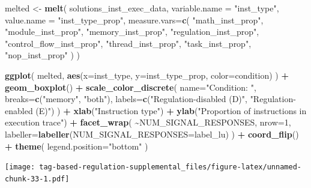 \documentclass[
]{book}
\newenvironment{Shaded}{\begin{snugshade}}{\end{snugshade}}
\newcommand{\DataTypeTok}[1]{\textcolor[rgb]{0.13,0.29,0.53}{#1}}
\newcommand{\DecValTok}[1]{\textcolor[rgb]{0.00,0.00,0.81}{#1}}
\newcommand{\KeywordTok}[1]{\textcolor[rgb]{0.13,0.29,0.53}{\textbf{#1}}}
\newcommand{\NormalTok}[1]{#1}
\newcommand{\OperatorTok}[1]{\textcolor[rgb]{0.81,0.36,0.00}{\textbf{#1}}}
\newcommand{\StringTok}[1]{\textcolor[rgb]{0.31,0.60,0.02}{#1}}
\begin{document}
\begin{Shaded}
\begin{Highlighting}[]
\NormalTok{melted \textless{}{-}}\StringTok{ }\KeywordTok{melt}\NormalTok{(}
\NormalTok{  solutions\_inst\_exec\_data,}
  \DataTypeTok{variable.name =} \StringTok{"inst\_type"}\NormalTok{,}
  \DataTypeTok{value.name =} \StringTok{"inst\_type\_prop"}\NormalTok{,}
  \DataTypeTok{measure.vars=}\KeywordTok{c}\NormalTok{(}
    \StringTok{"math\_inst\_prop"}\NormalTok{,}
    \StringTok{"module\_inst\_prop"}\NormalTok{,}
    \StringTok{"memory\_inst\_prop"}\NormalTok{,}
    \StringTok{"regulation\_inst\_prop"}\NormalTok{,}
    \StringTok{"control\_flow\_inst\_prop"}\NormalTok{,}
    \StringTok{"thread\_inst\_prop"}\NormalTok{,}
    \StringTok{"task\_inst\_prop"}\NormalTok{,}
    \StringTok{"nop\_inst\_prop"}
\NormalTok{  )}
\NormalTok{)}

\KeywordTok{ggplot}\NormalTok{( melted, }\KeywordTok{aes}\NormalTok{(}\DataTypeTok{x=}\NormalTok{inst\_type, }\DataTypeTok{y=}\NormalTok{inst\_type\_prop, }\DataTypeTok{color=}\NormalTok{condition) ) }\OperatorTok{+}
\StringTok{  }\KeywordTok{geom\_boxplot}\NormalTok{() }\OperatorTok{+}
\StringTok{  }\KeywordTok{scale\_color\_discrete}\NormalTok{(}
    \DataTypeTok{name=}\StringTok{"Condition: "}\NormalTok{,}
    \DataTypeTok{breaks=}\KeywordTok{c}\NormalTok{(}\StringTok{"memory"}\NormalTok{, }\StringTok{"both"}\NormalTok{),}
    \DataTypeTok{labels=}\KeywordTok{c}\NormalTok{(}\StringTok{"Regulation{-}disabled (D)"}\NormalTok{, }\StringTok{"Regulation{-}enabled (E)"}\NormalTok{)}
\NormalTok{  ) }\OperatorTok{+}
\StringTok{  }\KeywordTok{xlab}\NormalTok{(}\StringTok{"Instruction type"}\NormalTok{) }\OperatorTok{+}
\StringTok{  }\KeywordTok{ylab}\NormalTok{(}\StringTok{"Proportion of instructions in execution trace"}\NormalTok{) }\OperatorTok{+}
\StringTok{  }\KeywordTok{facet\_wrap}\NormalTok{(}
    \OperatorTok{\textasciitilde{}}\NormalTok{NUM\_SIGNAL\_RESPONSES,}
    \DataTypeTok{nrow=}\DecValTok{1}\NormalTok{,}
    \DataTypeTok{labeller=}\KeywordTok{labeller}\NormalTok{(}\DataTypeTok{NUM\_SIGNAL\_RESPONSES=}\NormalTok{label\_lu)}
\NormalTok{  ) }\OperatorTok{+}
\StringTok{  }\KeywordTok{coord\_flip}\NormalTok{() }\OperatorTok{+}
\StringTok{  }\KeywordTok{theme}\NormalTok{(}
    \DataTypeTok{legend.position=}\StringTok{"bottom"}
\NormalTok{  )}
\end{Highlighting}
\end{Shaded}

\texttt{[image: tag-based-regulation-supplemental\_files/figure-latex/unnamed-chunk-33-1.pdf]}
\end{document}
